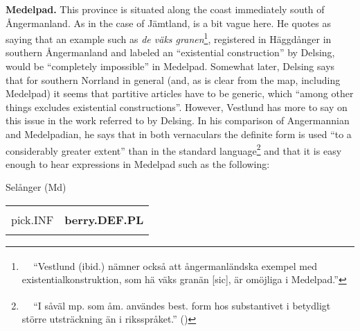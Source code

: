 \begin{styleBodytextheaded}
\textbf{Medelpad.} This province is situated along the coast immediately south of Ångermanland. As in the case of Jämtland, \citet[19]{Delsing2003a} is a bit vague here. He quotes \citet[21]{Vestlund1923} as saying that an example such as \textit{de väks granen}\footnote{\textsuperscript{\ \ } “Vestlund (ibid.) nämner också att ångermanländska exempel med existentialkonstruktion, som hä väks granän [sic], är omöjliga i Medelpad.”}, registered in Häggdånger in southern Ångermanland and labeled an “existential construction” by Delsing, would be “completely impossible” in Medelpad. Somewhat later, Delsing says that for southern Norrland in general (and, as is clear from the map, including Medelpad) it seems that partitive articles have to be generic, which “among other things excludes existential constructions”. However, Vestlund has more to say on this issue in the work referred to by Delsing. In his comparison of Angermannian and Medelpadian, he says that in both vernaculars the definite form is used “to a considerably greater extent” than in the standard language\footnote{\textsuperscript{\ \ } “I såväl mp. som åm. användes best. form hos substantivet i betydligt större utsträckning än i riksspråket.” (\citet[20]{Vestlund1923})} and that it is easy enough to hear expressions in Medelpad such as the following:

\end{styleBodytextheaded}

\begin{listWWNumileveli}
\item {}

\begin{styleExample}
Selånger (Md)

\end{styleExample}

\end{listWWNumileveli}

\begin{listWWNumxxxileveli}
\item {}

\end{listWWNumxxxileveli}

\begin{tabular}{ll}
\lsptoprule
\multicolumn{2}{l}{nôppä

}\\
pick.INF & {\bfseries berry.DEF.PL}\\
\lspbottomrule
\end{tabular}

